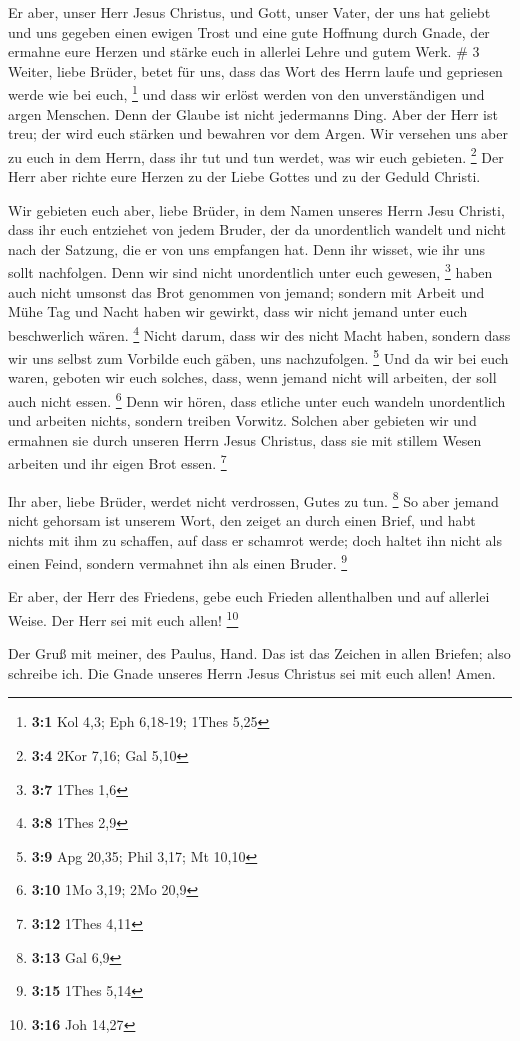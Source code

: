  Er aber, unser Herr Jesus Christus, und Gott, unser
Vater, der uns hat geliebt und uns gegeben einen ewigen Trost und eine
gute Hoffnung durch Gnade,  der ermahne eure Herzen und
stärke euch in allerlei Lehre und gutem Werk. \# 3 
Weiter, liebe Brüder, betet für uns, dass das Wort des Herrn laufe und
gepriesen werde wie bei euch, \footnote{\textbf{3:1} Kol 4,3; Eph
  6,18-19; 1Thes 5,25}  und dass wir erlöst werden von den
unverständigen und argen Menschen. Denn der Glaube ist nicht jedermanns
Ding.  Aber der Herr ist treu; der wird euch stärken und
bewahren vor dem Argen.  Wir versehen uns aber zu euch in
dem Herrn, dass ihr tut und tun werdet, was wir euch gebieten.
\footnote{\textbf{3:4} 2Kor 7,16; Gal 5,10}  Der Herr aber
richte eure Herzen zu der Liebe Gottes und zu der Geduld Christi.

 Wir gebieten euch aber, liebe Brüder, in dem Namen
unseres Herrn Jesu Christi, dass ihr euch entziehet von jedem Bruder,
der da unordentlich wandelt und nicht nach der Satzung, die er von uns
empfangen hat.  Denn ihr wisset, wie ihr uns sollt
nachfolgen. Denn wir sind nicht unordentlich unter euch gewesen,
\footnote{\textbf{3:7} 1Thes 1,6}  haben auch nicht
umsonst das Brot genommen von jemand; sondern mit Arbeit und Mühe Tag
und Nacht haben wir gewirkt, dass wir nicht jemand unter euch
beschwerlich wären. \footnote{\textbf{3:8} 1Thes 2,9} 
Nicht darum, dass wir des nicht Macht haben, sondern dass wir uns selbst
zum Vorbilde euch gäben, uns nachzufolgen. \footnote{\textbf{3:9} Apg
  20,35; Phil 3,17; Mt 10,10}  Und da wir bei euch waren,
geboten wir euch solches, dass, wenn jemand nicht will arbeiten, der
soll auch nicht essen. \footnote{\textbf{3:10} 1Mo 3,19; 2Mo 20,9}
 Denn wir hören, dass etliche unter euch wandeln
unordentlich und arbeiten nichts, sondern treiben Vorwitz.
 Solchen aber gebieten wir und ermahnen sie durch unseren
Herrn Jesus Christus, dass sie mit stillem Wesen arbeiten und ihr eigen
Brot essen. \footnote{\textbf{3:12} 1Thes 4,11}

 Ihr aber, liebe Brüder, werdet nicht verdrossen, Gutes
zu tun. \footnote{\textbf{3:13} Gal 6,9}  So aber jemand
nicht gehorsam ist unserem Wort, den zeiget an durch einen Brief, und
habt nichts mit ihm zu schaffen, auf dass er schamrot werde;
 doch haltet ihn nicht als einen Feind, sondern vermahnet
ihn als einen Bruder. \footnote{\textbf{3:15} 1Thes 5,14}

 Er aber, der Herr des Friedens, gebe euch Frieden
allenthalben und auf allerlei Weise. Der Herr sei mit euch allen!
\footnote{\textbf{3:16} Joh 14,27}

 Der Gruß mit meiner, des Paulus, Hand. Das ist das
Zeichen in allen Briefen; also schreibe ich.  Die Gnade
unseres Herrn Jesus Christus sei mit euch allen! Amen.
